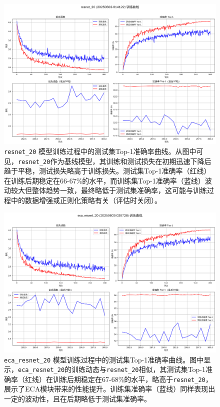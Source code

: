 \documentclass[a4paper]{article}
\begin{document}
\begin{figure}[H]
    \centering
    \includegraphics[width=\textwidth]{fig/training_curves_resnet_20.png}
    \caption{\texttt{resnet\_20} 模型训练过程中的测试集Top-1准确率曲线。从图中可见，\texttt{resnet\_20}作为基线模型，其训练和测试损失在初期迅速下降后趋于平稳，测试损失略高于训练损失。测试集Top-1准确率（红线）在训练后期稳定在66-67\%的水平，而训练集Top-1准确率（蓝线）波动较大但整体趋势一致，最终略低于测试集准确率，这可能与训练过程中的数据增强或正则化策略有关（评估时关闭）。}
    \label{fig:train_curve_resnet20}
\end{figure}

\begin{figure}[H]
    \centering
    \includegraphics[width=\textwidth]{fig/training_curves_eca_resnet_20.png}
    \caption{\texttt{eca\_resnet\_20} 模型训练过程中的测试集Top-1准确率曲线。图中显示，\texttt{eca\_resnet\_20}的训练动态与\texttt{resnet\_20}相似，其测试集Top-1准确率（红线）在训练后期稳定在67-68\%的水平，略高于\texttt{resnet\_20}，展示了ECA模块带来的性能提升。训练集准确率（蓝线）同样表现出一定的波动性，且在后期略低于测试集准确率。}
    \label{fig:train_curve_ecaresnet20}
\end{figure}
\end{document}
